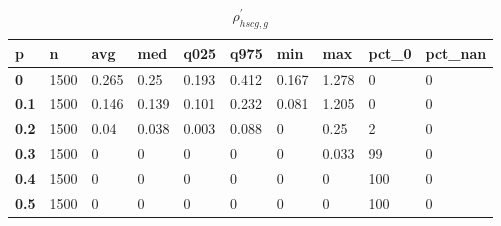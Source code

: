 \begin{table}[h]
 \centering 
\footnotesize
\caption{$\rho_{hscg,g}^\prime $}
\label{tab:alphahscgg}
\begin{tabular}[h]{|l|l|l|l|l|l|l|l|l|l|
    } \hline
\textbf{ p} & \textbf{ n} & \textbf{ avg} & \textbf{ med} & \textbf{ q025} & \textbf{ q975} & \textbf{ min} & \textbf{ max} & \textbf{ pct\_0} & \textbf{ pct\_nan}
    \\ \hline
  \textbf{  0} & 1500 & 0.265 &  0.25 & 0.193 & 0.412 & 0.167 & 1.278 &   0 & 0
    \\ \hline
  \textbf{0.1} & 1500 & 0.146 & 0.139 & 0.101 & 0.232 & 0.081 & 1.205 &   0 & 0
    \\ \hline
  \textbf{0.2} & 1500 &  0.04 & 0.038 & 0.003 & 0.088 &     0 &  0.25 &   2 & 0
    \\ \hline
  \textbf{0.3} & 1500 &     0 &     0 &     0 &     0 &     0 & 0.033 &  99 & 0
    \\ \hline
  \textbf{0.4} & 1500 &     0 &     0 &     0 &     0 &     0 &     0 & 100 & 0
    \\ \hline
  \textbf{0.5} & 1500 &     0 &     0 &     0 &     0 &     0 &     0 & 100 & 0
    \\ \hline
 \end{tabular}
 \end{table}

